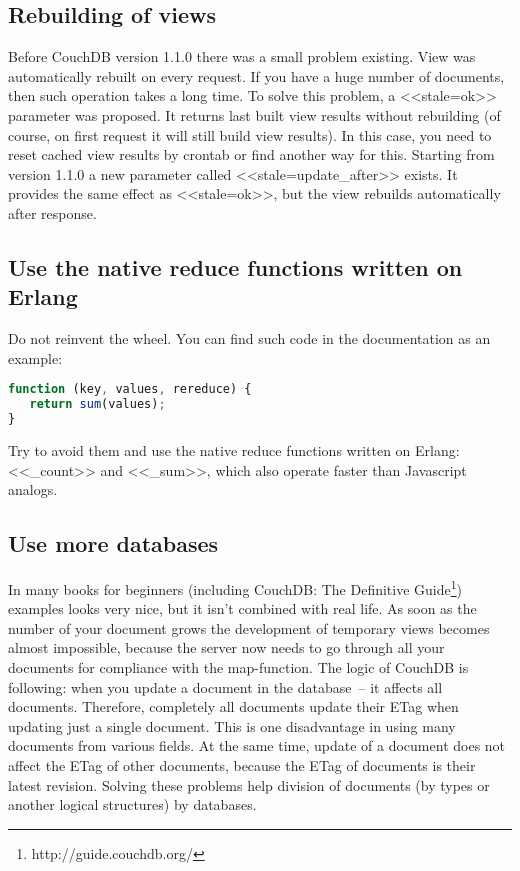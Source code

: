 \subsection{Rebuilding of views}

Before CouchDB version 1.1.0 there was a small problem existing. View was automatically rebuilt on every request. If you have a huge number of documents, then such operation takes a long time. To solve this problem, a <<stale=ok>> parameter was proposed. It returns last built view results without rebuilding (of course, on first request it will still build view results). In this case, you need to reset cached view results by crontab or find another way for this. Starting from version 1.1.0 a new parameter called <<stale=update\_after>> exists. It provides the same effect as <<stale=ok>>, but the view rebuilds automatically after response.

\subsection{Use the native reduce functions written on Erlang}

Do not reinvent the wheel. You can find such code in the documentation as an example:

\begin{lstlisting}[language=Javascript,label=lst:couchdb2,caption=Use the native reduce functions written on Erlang]
function (key, values, rereduce) {
   return sum(values);
}
\end{lstlisting}

Try to avoid them and use the native reduce functions written on Erlang: <<\_count>> and <<\_sum>>, which also operate faster than Javascript analogs.

\subsection{Use more databases}

In many books for beginners (including CouchDB: The Definitive Guide\footnote{http://guide.couchdb.org/}) examples looks very nice, but it isn’t combined with real life. As soon as the number of your document grows the development of temporary views becomes almost impossible, because the server now needs to go through all your documents for compliance with the map-function. The logic of CouchDB is following: when you update a document in the database~-- it affects all documents. Therefore, completely all documents update their ETag when updating just a single document. This is one disadvantage in using many documents from various fields. At the same time, update of a document does not affect the ETag of other documents, because the ETag of documents is their latest revision. Solving these problems help division of documents (by types or another logical structures) by databases.

